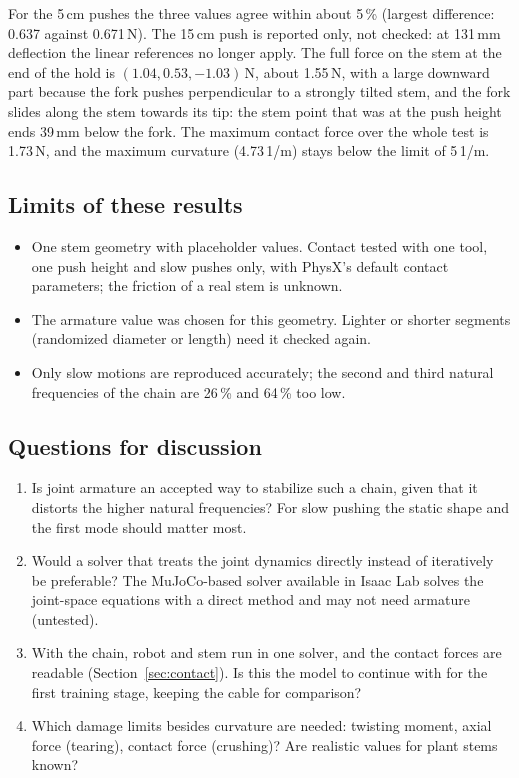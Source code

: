 For the 5\,cm pushes the three values agree within about 5\,\% (largest difference: 0.637 against 0.671\,N).
The 15\,cm push is reported only, not checked: at 131\,mm deflection the linear references no longer apply.
The full force on the stem at the end of the hold is $(1.04, 0.53, -1.03)$\,N, about 1.55\,N, with a large
downward part because the fork pushes perpendicular to a strongly tilted stem, and the fork slides along the
stem towards its tip: the stem point that was at the push height ends 39\,mm below the fork. The maximum
contact force over the whole test is 1.73\,N, and the maximum curvature (4.73\,1/m) stays below the limit of
5\,1/m.

\subsection{Limits of these results}

\begin{itemize}
  \item One stem geometry with placeholder values. Contact tested with one tool, one push height and slow
        pushes only, with PhysX's default contact parameters; the friction of a real stem is unknown.
  \item The armature value was chosen for this geometry. Lighter or shorter segments (randomized diameter or
        length) need it checked again.
  \item Only slow motions are reproduced accurately; the second and third natural frequencies of the chain are
        26\,\% and 64\,\% too low.
\end{itemize}

\subsection{Questions for discussion}

\begin{enumerate}
  \item Is joint armature an accepted way to stabilize such a chain, given that it distorts the higher natural
        frequencies? For slow pushing the static shape and the first mode should matter most.
  \item Would a solver that treats the joint dynamics directly instead of iteratively be preferable? The
        MuJoCo-based solver available in Isaac Lab solves the joint-space equations with a direct method and
        may not need armature (untested).
  \item With the chain, robot and stem run in one solver, and the contact forces are readable
        (Section~\ref{sec:contact}). Is this the model to continue with for the first training stage, keeping
        the cable for comparison?
  \item Which damage limits besides curvature are needed: twisting moment, axial force (tearing), contact force
        (crushing)? Are realistic values for plant stems known?
\end{enumerate}

